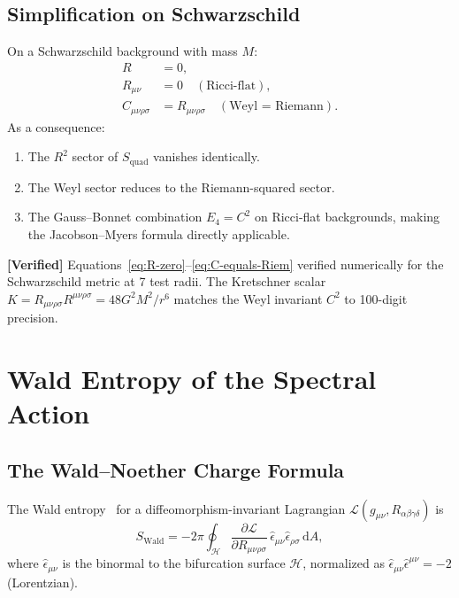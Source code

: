 \documentclass[11pt,a4paper]{article}
\renewcommand{\dd}{\mathrm{d}}
\theoremstyle{plain}
\theoremstyle{definition}
\newcommand{\verified}[1]{%
  \par\smallskip\noindent
  \colorbox{green!10}{\parbox{\dimexpr\linewidth-2\fboxsep}{%
    \textcolor{green!50!black}{\textbf{[Verified]}} #1}}%
  \par\smallskip}
\begin{document}
\subsection{Simplification on Schwarzschild}

On a Schwarzschild background with mass $M$:
\begin{align}
  R &= 0, \label{eq:R-zero} \\
  R_{\mu\nu} &= 0 \quad (\text{Ricci-flat}), \label{eq:Ric-zero} \\
  C_{\mu\nu\rho\sigma} &= R_{\mu\nu\rho\sigma}
  \quad (\text{Weyl = Riemann}). \label{eq:C-equals-Riem}
\end{align}
As a consequence:
\begin{enumerate}[nosep]
  \item The $R^2$ sector of $S_{\mathrm{quad}}$ vanishes identically.
  \item The Weyl sector reduces to the Riemann-squared sector.
  \item The Gauss--Bonnet combination $E_4 = C^2$ on Ricci-flat
    backgrounds, making the Jacobson--Myers formula directly applicable.
\end{enumerate}

\verified{Equations~\eqref{eq:R-zero}--\eqref{eq:C-equals-Riem}
verified numerically for the Schwarzschild metric at 7 test radii.
The Kretschner scalar $K = R_{\mu\nu\rho\sigma}R^{\mu\nu\rho\sigma}
= 48 G^2 M^2/r^6$ matches the Weyl invariant $C^2$ to 100-digit
precision.}

\section{Wald Entropy of the Spectral Action}\label{sec:wald}

\subsection{The Wald--Noether Charge Formula}

The Wald entropy~\cite{Wal93} for a diffeomorphism-invariant
Lagrangian $\mathcal{L}(g_{\mu\nu}, R_{\alpha\beta\gamma\delta})$ is
\begin{equation}\label{eq:wald-formula}
  S_{\mathrm{Wald}} = -2\pi \oint_{\mathcal{H}}
  \frac{\partial\mathcal{L}}{\partial R_{\mu\nu\rho\sigma}}\,
  \hat{\epsilon}_{\mu\nu}\hat{\epsilon}_{\rho\sigma}\,\dd A,
\end{equation}
where $\hat{\epsilon}_{\mu\nu}$ is the binormal to the bifurcation
surface $\mathcal{H}$, normalized as
$\hat{\epsilon}_{\mu\nu}\hat{\epsilon}^{\mu\nu} = -2$ (Lorentzian).
\end{document}
